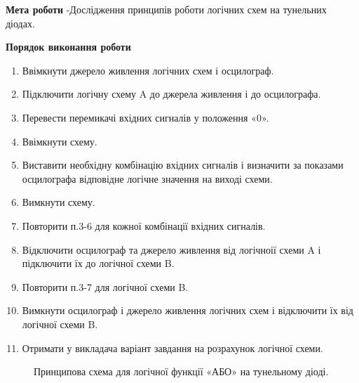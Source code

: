 \documentclass[a4paper,14pt]{extreport}
\begin{document}
\textbf{Мета роботи} -Дослідження принципів роботи логічних схем на тунельних діодах.
\begin{center}
\textbf{Порядок виконання роботи}
\end{center}
	\begin{enumerate}
	\item Ввімкнути джерело живлення логічних схем і осцилограф. 
	\item Підключити логічну схему A до джерела живлення і до осцилографа. 
	\item  Перевести перемикачі вхідних сигналів у положення «0». 
	\item  Ввімкнути схему. 
	\item  Виставити необхідну комбінацію вхідних сигналів і визначити за показами осцилографа відповідне логічне значення на виході схеми. 
	\item  Вимкнути схему. 
	\item  Повторити п.3-6 для кожної комбінації вхідних сигналів. 
	\item  Відключити осцилограф та джерело живлення від логічноії схеми A і підключити їх до логічної схеми B. 
	\item  Повторити п.3-7 для логічної схеми B. 
	\item  Вимкнути осцилограф і джерело живлення логічних схем і відключити їх від логічної схеми B. 
	\item  Отримати у викладача варіант завдання на розрахунок логічної схеми.
	\end{enumerate}

\begin{figure}[h!]
	\caption{Принципова схема для логічної функції «АБО» на тунельному діоді.}
	\label{ris1}
\end{figure}

\newpage
\end{document}

